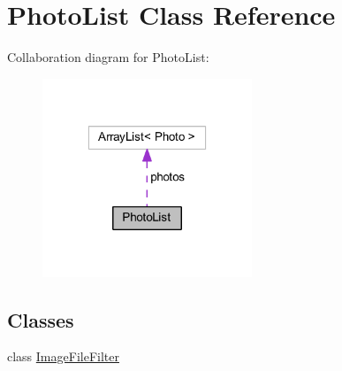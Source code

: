 \hypertarget{class_photo_list}{\section{Photo\-List Class Reference}
\label{class_photo_list}
}


Collaboration diagram for Photo\-List\-:
\nopagebreak
\begin{figure}[H]
\begin{center}
\leavevmode
\includegraphics[width=178pt]{class_photo_list__coll__graph}
\end{center}
\end{figure}
\subsection*{Classes}
\begin{DoxyCompactItemize}
\item 
class \hyperlink{class_photo_list_1_1_image_file_filter}{Image\-File\-Filter}
\end{DoxyCompactItemize}
